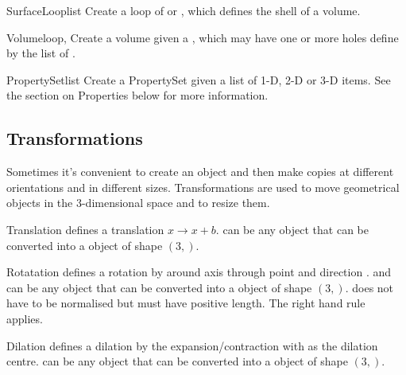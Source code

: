 \begin{classdesc}{SurfaceLoop}{list}
Create a loop of  or , which defines the shell of a volume.
\end{classdesc}

\begin{classdesc}{Volume}{loop, }
Create a volume given a , which may have one or more holes
define by the list of .
\end{classdesc}

\begin{classdesc}{PropertySet}{list}
Create a PropertySet given a list of 1-D, 2-D or 3-D items. See the section on Properties below for more information.
\end{classdesc}

\subsection{Transformations}

Sometimes it's convenient to create an object and then make copies at
different orientations and in different sizes.  Transformations are
used to move geometrical objects in the 3-dimensional space and to
resize them.

\begin{classdesc}{Translation}{}
defines a translation $x \to x+b$.  can be any object that can be converted 
into a \numpy object of shape $(3,)$.
\end{classdesc}
              
\begin{classdesc}{Rotatation}{ }
defines a rotation by  around axis through point  and direction . 
 and  can be any object that can be converted 
into a \numpy object of shape $(3,)$.
 does not have to be normalised but must have positive length. The right hand rule~\cite{RIGHTHANDRULE}
applies.
\end{classdesc}


\begin{classdesc}{Dilation}{}
defines a dilation by the expansion/contraction  with 
 as the dilation centre.
 can be any object that can be converted 
into a \numpy object of shape $(3,)$.
\end{classdesc}

